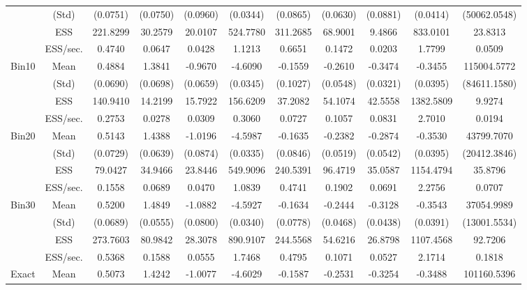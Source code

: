 {{\begin{table}
\begin{tabular}{cc ccc ccc ccc}
 & (Std) 
 & (0.0751)  & (0.0750)  & (0.0960)  & (0.0344)  & (0.0865)  & (0.0630)  & (0.0881)  & (0.0414)  & (50062.0548)  \\  [0.75ex] 
 & ESS 
 & 221.8299  & 30.2579  & 20.0107  & 524.7780  & 311.2685  & 68.9001  & 9.4866  & 833.0101  & 23.8313  \\  [0.75ex] 
[468.01 s]  & ESS/sec. 
 & 0.4740  & 0.0647  & 0.0428  & 1.1213  & 0.6651  & 0.1472  & 0.0203  & 1.7799  & 0.0509  \\  [1.3ex] 
Bin10 & Mean 
 & 0.4884  & 1.3841  & -0.9670  & -4.6090  & -0.1559  & -0.2610  & -0.3474  & -0.3455  & 115004.5772  \\  [0.75ex] 
 & (Std) 
 & (0.0690)  & (0.0698)  & (0.0659)  & (0.0345)  & (0.1027)  & (0.0548)  & (0.0321)  & (0.0395)  & (84611.1580)  \\  [0.75ex] 
 & ESS 
 & 140.9410  & 14.2199  & 15.7922  & 156.6209  & 37.2082  & 54.1074  & 42.5558  & 1382.5809  & 9.9274  \\  [0.75ex] 
[511.87 s]  & ESS/sec. 
 & 0.2753  & 0.0278  & 0.0309  & 0.3060  & 0.0727  & 0.1057  & 0.0831  & 2.7010  & 0.0194  \\  [1.3ex] 
Bin20 & Mean 
 & 0.5143  & 1.4388  & -1.0196  & -4.5987  & -0.1635  & -0.2382  & -0.2874  & -0.3530  & 43799.7070  \\  [0.75ex] 
 & (Std) 
 & (0.0729)  & (0.0639)  & (0.0874)  & (0.0335)  & (0.0846)  & (0.0519)  & (0.0542)  & (0.0395)  & (20412.3846)  \\  [0.75ex] 
 & ESS 
 & 79.0427  & 34.9466  & 23.8446  & 549.9096  & 240.5391  & 96.4719  & 35.0587  & 1154.4794  & 35.8796  \\  [0.75ex] 
[507.33 s]  & ESS/sec. 
 & 0.1558  & 0.0689  & 0.0470  & 1.0839  & 0.4741  & 0.1902  & 0.0691  & 2.2756  & 0.0707  \\  [1.3ex] 
Bin30 & Mean 
 & 0.5200  & 1.4849  & -1.0882  & -4.5927  & -0.1634  & -0.2444  & -0.3128  & -0.3543  & 37054.9989  \\  [0.75ex] 
 & (Std) 
 & (0.0689)  & (0.0555)  & (0.0800)  & (0.0340)  & (0.0778)  & (0.0468)  & (0.0438)  & (0.0391)  & (13001.5534)  \\  [0.75ex] 
 & ESS 
 & 273.7603  & 80.9842  & 28.3078  & 890.9107  & 244.5568  & 54.6216  & 26.8798  & 1107.4568  & 92.7206  \\  [0.75ex] 
[510.02 s]  & ESS/sec. 
 & 0.5368  & 0.1588  & 0.0555  & 1.7468  & 0.4795  & 0.1071  & 0.0527  & 2.1714  & 0.1818  \\  [1.3ex] 
Exact & Mean 
 & 0.5073  & 1.4242  & -1.0077  & -4.6029  & -0.1587  & -0.2531  & -0.3254  & -0.3488  & 101160.5396  \\  [0.75ex] 

\end{tabular}
\end{table}}}
